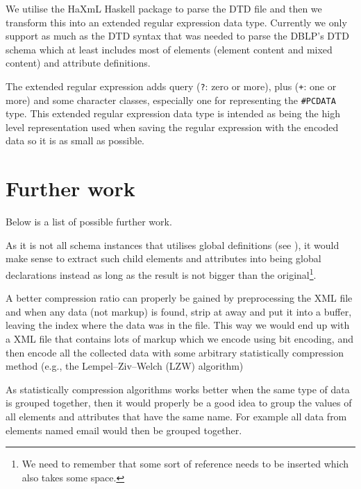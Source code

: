 \documentclass[a4paper, oneside]{memoir}
\theoremstyle{definition}
\begin{document}
We utilise the HaXmL Haskell package to parse the DTD file and then we transform
this into an extended regular expression data type. Currently we only support as
much as the DTD syntax that was needed to parse the DBLP's DTD schema which at
least includes most of elements (element content and mixed content) and
attribute definitions.

The extended regular expression adds query (\texttt{?}: zero or more), plus
(\texttt{+}: one or more) and some character classes, especially one for
representing the \texttt{\#PCDATA} type. This extended regular expression data
type is intended as being the high level representation used when saving the
regular expression with the encoded data so it is as small as possible.


\section{Further work}


Below is a list of possible further work.

\begin{description}
\item[Refactoring] As it is not all schema instances that utilises global
  definitions (see \label{sec:local-global-schema-definitions}), it would make
  sense to extract such child elements and attributes into being global
  declarations instead as long as the result is not bigger than the
  original\footnote{We need to remember that some sort of reference needs to be inserted
    which also takes some space.}.


\item A better compression ratio can properly be gained by preprocessing the XML
  file and when any data (not markup) is found, strip at away and put it into a
  buffer, leaving the index where the data was in the file. This way we would
  end up with a XML file that contains lots of markup which we encode using bit
  encoding, and then encode all the collected data with some arbitrary
  statistically compression method (e.g., the Lempel–Ziv–Welch (LZW) algorithm)

  As statistically compression algorithms works better when the same type of
  data is grouped together, then it would properly be a good idea to group the
  values of all elements and attributes that have the same name. For example all
  data from elements named email would then be grouped together.
  

\end{description}


%
%

%
%
%
\end{document}
